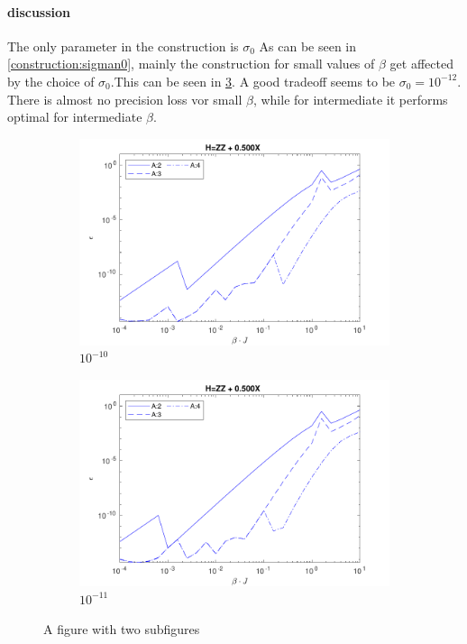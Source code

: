 \paragraph{discussion}

The only parameter in the construction is $\sigma_0$ As can be seen in \cref{construction:sigman0}, mainly the construction for small values of $\beta$ get affected by the choice of $\sigma_0$.This can be seen in \cref{fig:sigman0}. A good tradeoff seems to be $ \sigma_0 = {10}^{-12}$. There is almost no precision loss vor small $\beta$, while for intermediate it performs optimal for intermediate $\beta$.

\begin{figure}
    \centering
    \begin{subfigure}{\textwidth}
        \centering
        \includegraphics[width=0.8\linewidth]{Figuren/mpo_construction/sigm0/e10.pdf}
        \caption{ ${10}^{-10}$}
        \label{fig:sub1}
    \end{subfigure}%

    \begin{subfigure}{\textwidth}
        \centering
        \includegraphics[width=0.8\linewidth]{Figuren/mpo_construction/sigm0/e11.pdf}
        \caption{${10}^{-11}$}
        \label{fig:sub2}
    \end{subfigure}
    \caption{A figure with two subfigures}
    \label{fig:sigman0}
\end{figure}

